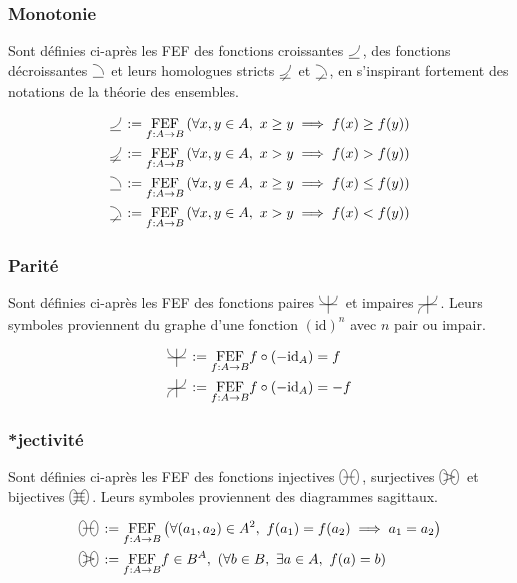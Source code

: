\documentclass{article}
\newcommand{\FEF}[1]{\underset{f:A\to B}{\text{FEF}}#1}
\newcommand{\decreasingfunctions}{%
	\begin{tikzpicture}[scale=1.75, baseline=0]%
		\draw (0,-0.25ex) -- (1ex,-0.25ex);%
		\draw (1ex,0) arc (0:90:1ex);%
	\end{tikzpicture}\,%
}
\newcommand{\strictlydecreasingfunctions}{%
	\begin{tikzpicture}[scale=1.75, baseline=0]%
		\draw (0,-0.25ex) -- (1ex,-0.25ex);%
		\draw (1ex,0) arc (0:90:1ex);%
		\draw (0.75ex,0.125ex) -- (0.25ex,-0.5ex);%
	\end{tikzpicture}\,%
}
\newcommand{\increasingfunctions}{%
	\begin{tikzpicture}[scale=1.75, baseline=0]%
		\draw (0,-0.25ex) -- (1ex,-0.25ex);%
		\draw (0,0) arc (-90:0:1ex);%
	\end{tikzpicture}\,%
}
\newcommand{\strictlyincreasingfunctions}{%
	\begin{tikzpicture}[scale=1.75, baseline=0]%
		\draw (0,-0.25ex) -- (1ex,-0.25ex);%
		\draw (0,0) arc (-90:0:1ex);%
		\draw (0.75ex,0.125ex) -- (0.25ex,-0.5ex);%
	\end{tikzpicture}\,%
}
\newcommand{\evenfunctions}{%
	\begin{tikzpicture}[scale=1.5, baseline=-0.5ex]%
		\draw (-1ex,0) -- (1ex,0);%
		\draw (0,-1ex) -- (0, 1ex);%
		\draw (0ex, 0ex) arc (-90:0:1ex);%
		\draw (0ex, 0ex) arc (90:0:-1ex);%
	\end{tikzpicture}\,%
}
\newcommand{\oddfunctions}{%
	\begin{tikzpicture}[scale=1.5, baseline=-0.5ex]%
		\draw (-1ex,0) -- (1ex,0);%
		\draw (0,-1ex) -- (0, 1ex);%
		\draw (0ex, 0ex) arc (-90:0:1ex);%
		\draw (0ex, 0ex) arc (-90:0:-1ex);%
	\end{tikzpicture}\,%
}
\newcommand{\bijections}{%
	\begin{tikzpicture}[scale=1.25, baseline=-0.75ex]%
		\draw (-0.75ex,0) ellipse (0.5ex and 1ex);
		\draw (0.75ex,0) ellipse (0.5ex and 1ex);
		\draw (-0.75ex,0.5ex) -- (0.75ex,0.5ex);
		\draw (-0.75ex,0) -- (0.75ex,0);
		\draw (-0.75ex,-0.5ex) -- (0.75ex,-0.5ex);
	\end{tikzpicture}\,%
}
\newcommand{\injections}{%
	\begin{tikzpicture}[scale=1.25, baseline=-0.75ex]%
		\draw (-0.75ex,0) ellipse (0.5ex and 1ex);
		\draw (0.75ex,0) ellipse (0.5ex and 1ex);
		\draw (-0.75ex,0) -- (0.75ex,0);
	\end{tikzpicture}\,%
}
\newcommand{\surjections}{%
	\begin{tikzpicture}[scale=1.25, baseline=-0.75ex]%
		\draw (-0.75ex,0) ellipse (0.5ex and 1ex);
		\draw (0.75ex,0) ellipse (0.5ex and 1ex);
		\draw (-0.75ex,0.5ex) -- (0.75ex,0);
		\draw (-0.75ex,-0.5ex) -- (0.75ex,0);
	\end{tikzpicture}\,%
}
\begin{document}
\subsubsection{Monotonie}

Sont définies ci-après les FEF des fonctions croissantes $\increasingfunctions$, des fonctions décroissantes $\decreasingfunctions$ et leurs homologues stricts $\strictlyincreasingfunctions$ et $\strictlydecreasingfunctions$, en s'inspirant fortement des notations de la théorie des ensembles.

\begin{align*}
	\increasingfunctions &:= \FEF{\left(\forall x,y\in A,\ x \ge y \implies f(x) \ge f(y)\right) } \\
	\strictlyincreasingfunctions &:= \FEF{\left(\forall x,y\in A,\ x > y \implies f(x) > f(y)\right) } \\
	\decreasingfunctions &:= \FEF{\left(\forall x,y\in A,\ x \ge y \implies f(x) \le f(y)\right) } \\
	\strictlydecreasingfunctions &:= \FEF{\left(\forall x,y\in A,\ x > y \implies f(x) < f(y)\right) } \\
\end{align*}

\subsubsection{Parité}
Sont définies ci-après les FEF des fonctions paires $\evenfunctions$ et impaires $\oddfunctions$. Leurs symboles proviennent du graphe d'une fonction $(\text{id})^n$ avec $n$ pair ou impair.

\begin{align*}
	\evenfunctions &:= \FEF{f \circ (-\text{id}_A) = f } \\
	\oddfunctions &:= \FEF{f \circ (-\text{id}_A) = -f} 
\end{align*}

\subsubsection{*jectivité}

Sont définies ci-après les FEF des fonctions injectives $\injections$, surjectives $\surjections$ et bijectives $\bijections$. Leurs symboles proviennent des diagrammes sagittaux.

\begin{align*}
	\injections &:= \FEF{\left( \forall (a_1,a_2)\in A^2,\ f(a_1)=f(a_2)\implies a_1 = a_2 \right)} \\
	\surjections &:= \FEF{f\in B^A,\ \left( \forall b\in B,\ \exists a\in A,\ f(a)=b \right)}\\
\end{align*}
\end{document}
